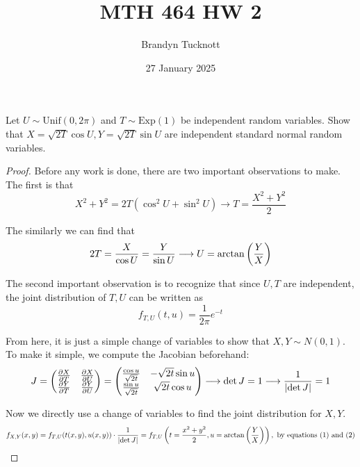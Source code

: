\documentclass{exam}
\title{MTH 464 HW 2}
\author{Brandyn Tucknott}
\date{27 January 2025}
\begin{document}
\maketitle

\begin{questions}
    \question
Let $U\sim \text{Unif}(0, 2\pi)$ and $T\sim \text{Exp}(1)$ be independent random variables. Show that $X = \sqrt{2T}\cos U, Y = \sqrt{2T}\sin U$ are independent standard normal random variables.

\begin{proof}
    Before any work is done, there are two important observations to make. The first is that
    \begin{equation}
        X^2 + Y^2 = 2T(\cos^2 U + \sin^2 U) \longrightarrow T = \frac{X^2 + Y^2}{2}
    \end{equation}

    The similarly we can find that
    \begin{equation}
        2T = \frac{X}{\cos U} = \frac{Y}{\sin U} \longrightarrow
        U = \arctan \left( \frac{Y}{X} \right)
    \end{equation}

    The second important observation is to recognize that since $U, T$ are independent, the joint distribution of $T, U$ can be written as
    \begin{equation}
        f_{T, U} (t, u) = \frac{1}{2\pi}e^{-t}
    \end{equation}

    From here, it is just a simple change of variables to show that $X, Y \sim N(0, 1)$.
    To make it simple, we compute the Jacobian beforehand:
    $$J = \left( \begin{matrix}
        \frac{\partial X}{\partial T} & \frac{\partial X}{\partial U} \\
        \frac{\partial Y}{\partial T} & \frac{\partial Y}{\partial U} \\
    \end{matrix} \right) = \left( \begin{matrix}
        \frac{\cos u}{\sqrt{2t}} & -\sqrt{2t}\sin u \\
        \frac{\sin u}{\sqrt{2t}} & \sqrt{2t}\cos u \\
    \end{matrix} \right) \longrightarrow \det J = 1 \longrightarrow \frac{1}{\left| \det J \right|} = 1$$

    Now we directly use a change of variables to find the joint distribution for $X, Y$.
    $$f_{X, Y}(x, y) = f_{T, U}(t(x, y), u(x, y))\cdot \frac{1}{\left| \det J \right|} = f_{T, U} \left( t = \frac{x^2 + y^2}{2}, u = \arctan \left( \frac{Y}{X} \right) \right), \text{ by equations (1) and (2)}$$
    

\end{proof}
\end{questions}
\end{document}
